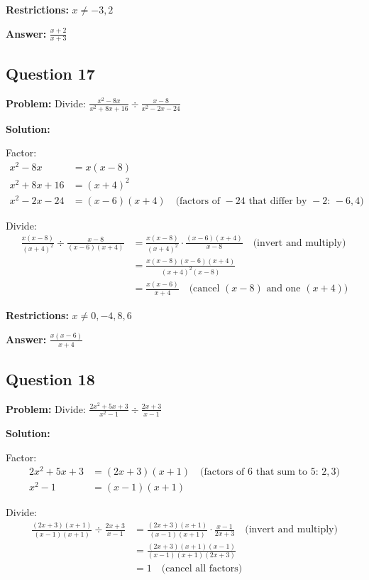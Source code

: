 \documentclass[12pt]{article}
\begin{document}
\textbf{Restrictions:} $x \neq -3, 2$

\textbf{Answer:} $\boxed{\frac{x+2}{x+3}}$

\subsection*{Question 17}
\textbf{Problem:} Divide: $\frac{x^2-8x}{x^2+8x+16} \div \frac{x-8}{x^2-2x-24}$

\textbf{Solution:}

Factor:
\begin{align*}
x^2 - 8x &= x(x-8) \\
x^2 + 8x + 16 &= (x+4)^2 \\
x^2 - 2x - 24 &= (x-6)(x+4) \quad \text{(factors of } -24 \text{ that differ by } -2 \text{: } -6, 4 \text{)}
\end{align*}

Divide:
\begin{align*}
\frac{x(x-8)}{(x+4)^2} \div \frac{x-8}{(x-6)(x+4)} &= \frac{x(x-8)}{(x+4)^2} \cdot \frac{(x-6)(x+4)}{x-8} \quad \text{(invert and multiply)} \\
&= \frac{x(x-8)(x-6)(x+4)}{(x+4)^2(x-8)} \\
&= \frac{x(x-6)}{x+4} \quad \text{(cancel } (x-8) \text{ and one } (x+4) \text{)}
\end{align*}

\textbf{Restrictions:} $x \neq 0, -4, 8, 6$

\textbf{Answer:} $\boxed{\frac{x(x-6)}{x+4}}$

\subsection*{Question 18}
\textbf{Problem:} Divide: $\frac{2x^2+5x+3}{x^2-1} \div \frac{2x+3}{x-1}$

\textbf{Solution:}

Factor:
\begin{align*}
2x^2 + 5x + 3 &= (2x+3)(x+1) \quad \text{(factors of } 6 \text{ that sum to } 5 \text{: } 2, 3 \text{)} \\
x^2 - 1 &= (x-1)(x+1)
\end{align*}

Divide:
\begin{align*}
\frac{(2x+3)(x+1)}{(x-1)(x+1)} \div \frac{2x+3}{x-1} &= \frac{(2x+3)(x+1)}{(x-1)(x+1)} \cdot \frac{x-1}{2x+3} \quad \text{(invert and multiply)} \\
&= \frac{(2x+3)(x+1)(x-1)}{(x-1)(x+1)(2x+3)} \\
&= 1 \quad \text{(cancel all factors)}
\end{align*}
\end{document}
